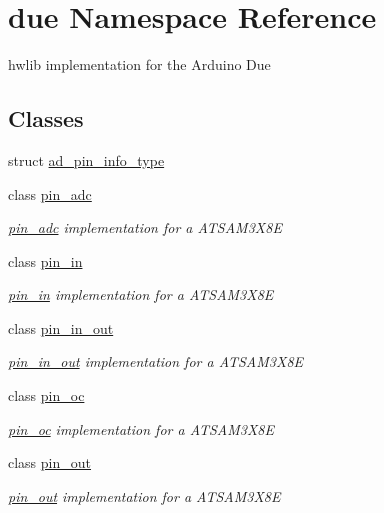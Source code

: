 \hypertarget{namespacedue}{}\section{due Namespace Reference}
\label{namespacedue}


hwlib implementation for the Arduino Due  


\subsection*{Classes}
\begin{DoxyCompactItemize}
\item 
struct \hyperlink{structdue_1_1ad__pin__info__type}{ad\+\_\+pin\+\_\+info\+\_\+type}
\item 
class \hyperlink{classdue_1_1pin__adc}{pin\+\_\+adc}
\begin{DoxyCompactList}\small\item\em \hyperlink{classdue_1_1pin__adc}{pin\+\_\+adc} implementation for a A\+T\+S\+A\+M3\+X8E \end{DoxyCompactList}\item 
class \hyperlink{classdue_1_1pin__in}{pin\+\_\+in}
\begin{DoxyCompactList}\small\item\em \hyperlink{classdue_1_1pin__in}{pin\+\_\+in} implementation for a A\+T\+S\+A\+M3\+X8E \end{DoxyCompactList}\item 
class \hyperlink{classdue_1_1pin__in__out}{pin\+\_\+in\+\_\+out}
\begin{DoxyCompactList}\small\item\em \hyperlink{classdue_1_1pin__in__out}{pin\+\_\+in\+\_\+out} implementation for a A\+T\+S\+A\+M3\+X8E \end{DoxyCompactList}\item 
class \hyperlink{classdue_1_1pin__oc}{pin\+\_\+oc}
\begin{DoxyCompactList}\small\item\em \hyperlink{classdue_1_1pin__oc}{pin\+\_\+oc} implementation for a A\+T\+S\+A\+M3\+X8E \end{DoxyCompactList}\item 
class \hyperlink{classdue_1_1pin__out}{pin\+\_\+out}
\begin{DoxyCompactList}\small\item\em \hyperlink{classdue_1_1pin__out}{pin\+\_\+out} implementation for a A\+T\+S\+A\+M3\+X8E \end{DoxyCompactList}\end{DoxyCompactItemize}
